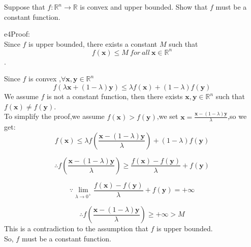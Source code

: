 \documentclass{article}
\newcommand{\xB}{\mathbf{x}}
\newcommand{\yB}{\mathbf{y}}
\begin{document}
\begin{excercise}\label{e4}
Suppose that $f : \mathbb{R}^n \rightarrow \mathbb{R}$ is convex and upper bounded. Show that $f$ must
be a constant function.
\end{excercise}

\begin{PROOF}{e4}Proof:\\
Since \(f\) is upper bounded, there exists a constant \(M\) such that \\
\[f(\xB) \le M \ for\  all \ \xB \in \mathbb{R}^n\].

Since \(f\) is convex ,\(\forall \xB, \yB \in \mathbb{R}^n \)\\
	\[
		f(\lambda \xB+(1-\lambda) \yB)\le \lambda f(\xB)+(1-\lambda)f(\yB)
	\]
We assume $f$ is not a constant function, then there exists \(\xB, \yB \in \mathbb{R}^n\) such that \(f(\xB) \neq f(\yB)\).\\
To simplify the proof,we assume \(f(\xB) > f(\yB)\),we set $\xB = \frac{\xB-(1-\lambda)\yB}{\lambda}$,so we get:
	\[
	f(\xB) \le \lambda f(\frac{\xB-(1-\lambda)\yB}{\lambda}) + (1-\lambda)f(\yB)
	\]

	\[
	\therefore f(\frac{\xB-(1-\lambda)\yB}{\lambda}) \ge \frac{f(\xB)-f(\yB)}{\lambda}+f(\yB)
	\]

	\[
	\because \lim_{\lambda \to 0^{+}} \frac{f(\xB)-f(\yB)}{\lambda}+f(\yB) = +\infty
	\]

	\[
	\therefore f(\frac{\xB-(1-\lambda)\yB}{\lambda}) \ge +\infty > M
	\]
This is a contradiction to the assumption that \(f\) is upper bounded.\\
So, \(f\) must be a constant function.

\end{PROOF}
\end{document}
